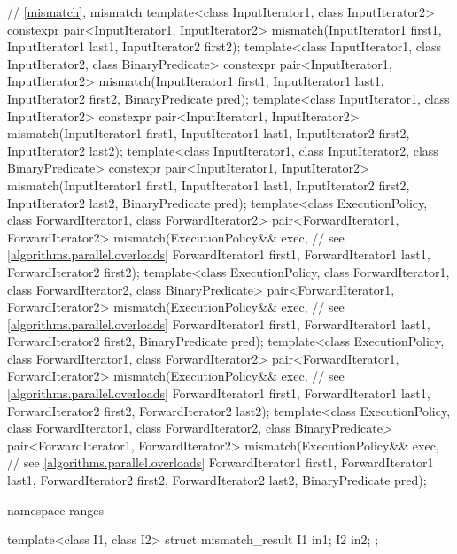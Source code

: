 \begin{codeblock}
{  // \ref{mismatch}, mismatch
  template<class InputIterator1, class InputIterator2>
    constexpr pair<InputIterator1, InputIterator2>
      mismatch(InputIterator1 first1, InputIterator1 last1,
               InputIterator2 first2);
  template<class InputIterator1, class InputIterator2, class BinaryPredicate>
    constexpr pair<InputIterator1, InputIterator2>
      mismatch(InputIterator1 first1, InputIterator1 last1,
               InputIterator2 first2, BinaryPredicate pred);
  template<class InputIterator1, class InputIterator2>
    constexpr pair<InputIterator1, InputIterator2>
      mismatch(InputIterator1 first1, InputIterator1 last1,
               InputIterator2 first2, InputIterator2 last2);
  template<class InputIterator1, class InputIterator2, class BinaryPredicate>
    constexpr pair<InputIterator1, InputIterator2>
      mismatch(InputIterator1 first1, InputIterator1 last1,
               InputIterator2 first2, InputIterator2 last2,
               BinaryPredicate pred);
  template<class ExecutionPolicy, class ForwardIterator1, class ForwardIterator2>
    pair<ForwardIterator1, ForwardIterator2>
      mismatch(ExecutionPolicy&& exec, // see \ref{algorithms.parallel.overloads}
               ForwardIterator1 first1, ForwardIterator1 last1,
               ForwardIterator2 first2);
  template<class ExecutionPolicy, class ForwardIterator1, class ForwardIterator2,
           class BinaryPredicate>
    pair<ForwardIterator1, ForwardIterator2>
      mismatch(ExecutionPolicy&& exec, // see \ref{algorithms.parallel.overloads}
               ForwardIterator1 first1, ForwardIterator1 last1,
               ForwardIterator2 first2, BinaryPredicate pred);
  template<class ExecutionPolicy, class ForwardIterator1, class ForwardIterator2>
    pair<ForwardIterator1, ForwardIterator2>
      mismatch(ExecutionPolicy&& exec, // see \ref{algorithms.parallel.overloads}
               ForwardIterator1 first1, ForwardIterator1 last1,
               ForwardIterator2 first2, ForwardIterator2 last2);
  template<class ExecutionPolicy, class ForwardIterator1, class ForwardIterator2,
           class BinaryPredicate>
    pair<ForwardIterator1, ForwardIterator2>
      mismatch(ExecutionPolicy&& exec, // see \ref{algorithms.parallel.overloads}
               ForwardIterator1 first1, ForwardIterator1 last1,
               ForwardIterator2 first2, ForwardIterator2 last2,
               BinaryPredicate pred);

  namespace ranges {
    template<class I1, class I2>
    struct mismatch_result {
      I1 in1;
      I2 in2;
    };

}}
\end{codeblock}
